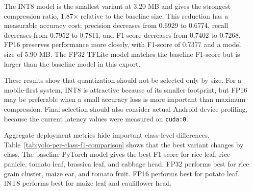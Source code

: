The INT8 model is the smallest variant at 3.20 MB and gives the strongest compression ratio,
1.87$\times$ relative to the baseline size. This reduction has a measurable accuracy cost:
precision decreases from 0.6929 to 0.6774, recall decreases from 0.7952 to 0.7811, and F1-score
decreases from 0.7402 to 0.7268. FP16 preserves performance more closely, with F1-score of 0.7377
and a model size of 5.90 MB. The FP32 TFLite model matches the baseline F1-score but is larger
than the baseline model in this export.

These results show that quantization should not be selected only by size. For a mobile-first
system, INT8 is attractive because of its smaller footprint, but FP16 may be preferable when a
small accuracy loss is more important than maximum compression. Final selection should also
consider actual Android-device profiling, because the current latency values were measured on
\texttt{cuda:0}.


Aggregate deployment metrics hide important class-level differences. Table~\ref{tab:yolo-per-class-f1-comparison}
shows that the best variant changes by class. The baseline PyTorch model gives the best F1-score
for rice leaf, rice panicle, tomato leaf, brassica leaf, and cabbage head. FP32 performs best for
rice grain cluster, maize ear, and tomato fruit. FP16 performs best for potato leaf. INT8 performs
best for maize leaf and cauliflower head.

\begin{table}[H]
  \centering
  \caption{Per-class F1-score comparison across YOLO model variants}
  \label{tab:yolo-per-class-f1-comparison}
  \small
\end{table}

